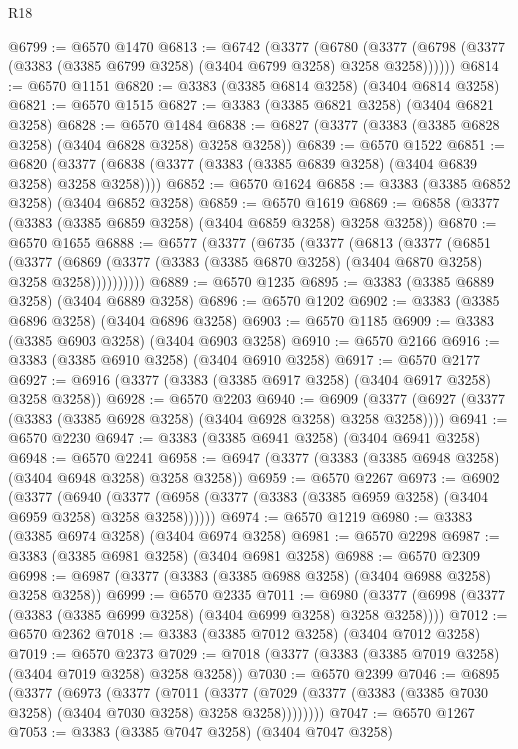 \begin{lexlean}{R18}
\begin{coremodule}
@6799 := @6570 @1470
@6813 := @6742
    (@3377
      (@6780 (@3377 (@6798 (@3377 (@3383 (@3385 @6799 @3258) (@3404 @6799 @3258) @3258 @3258))))))
@6814 := @6570 @1151
@6820 := @3383 (@3385 @6814 @3258) (@3404 @6814 @3258)
@6821 := @6570 @1515
@6827 := @3383 (@3385 @6821 @3258) (@3404 @6821 @3258)
@6828 := @6570 @1484
@6838 := @6827 (@3377 (@3383 (@3385 @6828 @3258) (@3404 @6828 @3258) @3258 @3258))
@6839 := @6570 @1522
@6851 := @6820 (@3377 (@6838 (@3377 (@3383 (@3385 @6839 @3258) (@3404 @6839 @3258) @3258 @3258))))
@6852 := @6570 @1624
@6858 := @3383 (@3385 @6852 @3258) (@3404 @6852 @3258)
@6859 := @6570 @1619
@6869 := @6858 (@3377 (@3383 (@3385 @6859 @3258) (@3404 @6859 @3258) @3258 @3258))
@6870 := @6570 @1655
@6888 := @6577
    (@3377
      (@6735
        (@3377
          (@6813
            (@3377
              (@6851
                (@3377
                  (@6869 (@3377 (@3383 (@3385 @6870 @3258) (@3404 @6870 @3258) @3258 @3258))))))))))
@6889 := @6570 @1235
@6895 := @3383 (@3385 @6889 @3258) (@3404 @6889 @3258)
@6896 := @6570 @1202
@6902 := @3383 (@3385 @6896 @3258) (@3404 @6896 @3258)
@6903 := @6570 @1185
@6909 := @3383 (@3385 @6903 @3258) (@3404 @6903 @3258)
@6910 := @6570 @2166
@6916 := @3383 (@3385 @6910 @3258) (@3404 @6910 @3258)
@6917 := @6570 @2177
@6927 := @6916 (@3377 (@3383 (@3385 @6917 @3258) (@3404 @6917 @3258) @3258 @3258))
@6928 := @6570 @2203
@6940 := @6909 (@3377 (@6927 (@3377 (@3383 (@3385 @6928 @3258) (@3404 @6928 @3258) @3258 @3258))))
@6941 := @6570 @2230
@6947 := @3383 (@3385 @6941 @3258) (@3404 @6941 @3258)
@6948 := @6570 @2241
@6958 := @6947 (@3377 (@3383 (@3385 @6948 @3258) (@3404 @6948 @3258) @3258 @3258))
@6959 := @6570 @2267
@6973 := @6902
    (@3377
      (@6940 (@3377 (@6958 (@3377 (@3383 (@3385 @6959 @3258) (@3404 @6959 @3258) @3258 @3258))))))
@6974 := @6570 @1219
@6980 := @3383 (@3385 @6974 @3258) (@3404 @6974 @3258)
@6981 := @6570 @2298
@6987 := @3383 (@3385 @6981 @3258) (@3404 @6981 @3258)
@6988 := @6570 @2309
@6998 := @6987 (@3377 (@3383 (@3385 @6988 @3258) (@3404 @6988 @3258) @3258 @3258))
@6999 := @6570 @2335
@7011 := @6980 (@3377 (@6998 (@3377 (@3383 (@3385 @6999 @3258) (@3404 @6999 @3258) @3258 @3258))))
@7012 := @6570 @2362
@7018 := @3383 (@3385 @7012 @3258) (@3404 @7012 @3258)
@7019 := @6570 @2373
@7029 := @7018 (@3377 (@3383 (@3385 @7019 @3258) (@3404 @7019 @3258) @3258 @3258))
@7030 := @6570 @2399
@7046 := @6895
    (@3377
      (@6973
        (@3377
          (@7011
            (@3377 (@7029 (@3377 (@3383 (@3385 @7030 @3258) (@3404 @7030 @3258) @3258 @3258))))))))
@7047 := @6570 @1267
@7053 := @3383 (@3385 @7047 @3258) (@3404 @7047 @3258)

\end{coremodule}
\end{lexlean}
